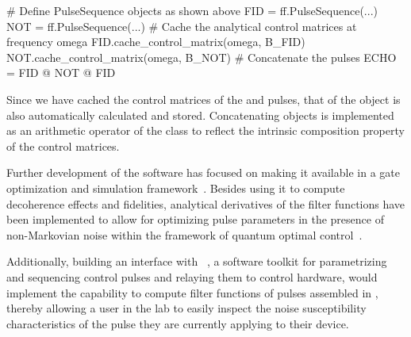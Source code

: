 \begin{pycode}
    # Define PulseSequence objects as shown above
    FID = ff.PulseSequence(...)
    NOT = ff.PulseSequence(...)
    # Cache the analytical control matrices at frequency omega
    FID.cache_control_matrix(omega, B_FID)
    NOT.cache_control_matrix(omega, B_NOT)
    # Concatenate the pulses
    ECHO = FID @ NOT @ FID
\end{pycode}

Since we have cached the control matrices of the  and  pulses, that of the  object is also automatically calculated and stored.
Concatenating \pulsesequence objects is implemented as an arithmetic operator of the class to reflect the intrinsic composition property of the control matrices.

Further development of the software has focused on making it available in a gate optimization and simulation framework~\cite{Teske2022a}.
Besides using it to compute decoherence effects and fidelities, analytical derivatives of the filter functions have been implemented to allow for optimizing pulse parameters in the presence of non-Markovian noise within the framework of quantum optimal control~\cite{Le2022,Teske2022}.

Additionally, building an interface with \qupulse~\cite{Humpohl2025,Humpohl2021}, a software toolkit for parametrizing and sequencing control pulses and relaying them to control hardware, would implement the capability to compute filter functions of pulses assembled in \qupulse, thereby allowing a user in the lab to easily inspect the noise susceptibility characteristics of the pulse they are currently applying to their device.
